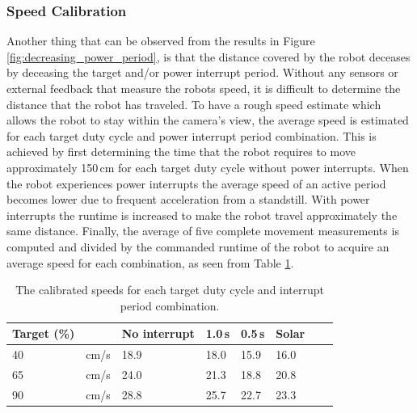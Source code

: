 \subsubsection{Speed Calibration}
Another thing that can be observed from the results in Figure \ref{fig:decreasing_power_period}, is that the distance covered by the robot deceases by deceasing the target and/or power interrupt period.
Without any sensors or external feedback that measure the robots speed, it is difficult to determine the distance that the robot has traveled.
To have a rough speed estimate which allows the robot to stay within the camera's view, the average speed is estimated for each target duty cycle and power interrupt period combination.
This is achieved by first determining the time that the robot requires to move approximately 150\,cm for each target duty cycle without power interrupts.
When the robot experiences power interrupts the average speed of an active period becomes lower due to frequent acceleration from a standstill.
With power interrupts the runtime is increased to make the robot travel approximately the same distance.
Finally, the average of five complete movement measurements is computed and divided by the commanded runtime of the robot to acquire an average speed for each combination, as seen from Table \ref{tab:val_calib}.


\begin{table}[t]
	\centering
	\small
	\caption{The calibrated speeds for each target duty cycle and interrupt period combination.}
	\label{tab:val_calib}
	\begin{tabular}{|l|l||l|l|l|l|l|l|}
		\hline
		Target (\%) & & No interrupt & 1.0\,s & 0.5\,s & Solar \\
		\hline \hline
		 40 & cm/s & 18.9 & 18.0 & 15.9 & 16.0\\
	     65 & cm/s & 24.0 & 21.3 & 18.8 & 20.8\\
		 90 & cm/s & 28.8 & 25.7 & 22.7 & 23.3 \\
		\hline
	\end{tabular}
\end{table}


